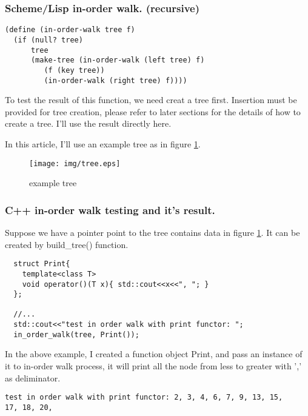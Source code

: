 \documentclass{article}
\begin{document}
\subsubsection*{Scheme/Lisp in-order walk. (recursive)}
\lstset{language=lisp}
\begin{lstlisting}
(define (in-order-walk tree f)
  (if (null? tree) 
      tree
      (make-tree (in-order-walk (left tree) f)
		 (f (key tree))
		 (in-order-walk (right tree) f))))
\end{lstlisting}

To test the result of this function, we need creat a tree first. Insertion
must be provided for tree creation, please refer to later sections for the
details of how to create a tree. I'll use the result directly here.

In this article, I'll use an example tree as in figure \ref{fig:example-tree}.

\begin{figure}[htbp]
       \begin{center}
	\texttt{[image: img/tree.eps]}
        \caption{example tree} \label{fig:example-tree}
       \end{center}
\end{figure}

\subsubsection*{C++ in-order walk testing and it's result.}

Suppose we have a pointer point to the tree contains data in figure 
\ref{fig:example-tree}. It can be created by build\_tree() function.

\lstset{language=C++}
\begin{lstlisting}
  struct Print{
    template<class T>
    void operator()(T x){ std::cout<<x<<", "; }
  };

  //...
  std::cout<<"test in order walk with print functor: ";
  in_order_walk(tree, Print());
\end{lstlisting}

In the above example, I created a function object Print, and pass an
instance of it to in-order walk process, it will print all the node
from less to greater with ',' as deliminator.

\begin{verbatim}
test in order walk with print functor: 2, 3, 4, 6, 7, 9, 13, 15, 
17, 18, 20,
\end{verbatim}
\end{document}

